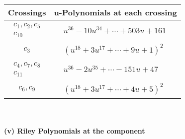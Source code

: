 \documentclass[1p]{elsarticle_modified}
\theoremstyle{definition}
\begin{document}
\begin{tabular}{m{50pt}|m{274pt}}
Crossings & \hspace{64pt}u-Polynomials at each crossing \\
\hline $$\begin{aligned}c_{1},c_{2},c_{5}\\c_{10}\end{aligned}$$&$\begin{aligned}
&u^{36}-10 u^{34}+\cdots+503 u+161
\end{aligned}$\\
\hline $$\begin{aligned}c_{3}\end{aligned}$$&$\begin{aligned}
&(u^{18}+3 u^{17}+\cdots+9 u+1)^{2}
\end{aligned}$\\
\hline $$\begin{aligned}c_{4},c_{7},c_{8}\\c_{11}\end{aligned}$$&$\begin{aligned}
&u^{36}-2 u^{35}+\cdots-151 u+47
\end{aligned}$\\
\hline $$\begin{aligned}c_{6},c_{9}\end{aligned}$$&$\begin{aligned}
&(u^{18}+3 u^{17}+\cdots+4 u+5)^{2}
\end{aligned}$\\
\hline
\end{tabular}\\~\\
\newpage\renewcommand{\arraystretch}{1}
\flushleft \textbf{(v) Riley Polynomials at the component}\newline \\
\end{document}
